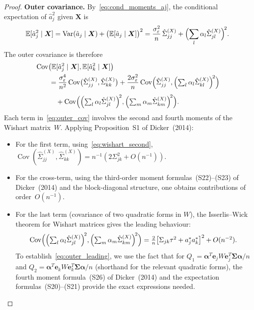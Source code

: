 \documentclass[11pt]{article}
\newcommand{\E}{\mathbb{E}}
\newcommand{\Var}{\operatorname{Var}}
\newcommand{\Cov}{\operatorname{Cov}}
\newcommand{\X}{\bm{X}}
\newcommand{\bSig}{\bm{\Sigma}}
\newcommand{\bal}{\bm{\alpha}}
\newcommand{\be}{\bm{e}}
\begin{document}
\begin{proof}
\medskip
\noindent\textbf{Outer covariance.}\;
By~\eqref{eq:cond_moments_aj}, the conditional expectation of $\hat{a}_j^{2}$ given $\X$ is
\[
  \E[\hat{a}_j^{2}\mid\X]
  = \Var(\hat{a}_j\mid\X)+\bigl(\E[\hat{a}_j\mid\X]\bigr)^{2}
  = \frac{\sigma_\varepsilon^{2}}{n}\,\hat\Sigma_{jj}^{(X)}
    + \Bigl(\sum_l\alpha_l\hat\Sigma_{jl}^{(X)}\Bigr)^{\!2}.
\]
The outer covariance is therefore
\begin{align}
  &\Cov\bigl(\E[\hat{a}_j^{2}\mid\X],\E[\hat{a}_k^{2}\mid\X]\bigr)
  \notag\\
  &\qquad= \frac{\sigma_\varepsilon^{4}}{n^{2}}\Cov\bigl(\hat\Sigma_{jj}^{(X)},
    \hat\Sigma_{kk}^{(X)}\bigr)
  + \frac{2\sigma_\varepsilon^{2}}{n}
    \Cov\Bigl(\hat\Sigma_{jj}^{(X)},
    \Bigl(\textstyle\sum_l\alpha_l\hat\Sigma_{kl}^{(X)}\Bigr)^{\!2}\Bigr)
  \notag\\[4pt]
  &\qquad\quad
  + \Cov\Bigl(\Bigl(\textstyle\sum_l\alpha_l\hat\Sigma_{jl}^{(X)}\Bigr)^{\!2},
    \Bigl(\textstyle\sum_m\alpha_m\hat\Sigma_{km}^{(X)}\Bigr)^{\!2}\Bigr).
  \label{eq:outer_cov}
\end{align}
Each term in~\eqref{eq:outer_cov} involves the second and fourth moments of
the Wishart matrix~$W$.  Applying Proposition~S1 of Dicker~(2014):

\begin{itemize}
\item For the first term, using~\eqref{eq:wishart_second},
  $\Cov(\hat\Sigma_{jj}^{(X)},\hat\Sigma_{kk}^{(X)})
  = n^{-1}(2\Sigma_{jk}^{2}+O(n^{-1}))$.

\item For the cross-term, using the third-order moment
  formulas~(S22)--(S23) of Dicker~(2014) and the block-diagonal structure,
  one obtains contributions of order~$O(n^{-1})$.

\item For the last term (covariance of two quadratic forms in $W$), the
  Isserlis--Wick theorem for Wishart matrices gives the leading behaviour:
  \begin{equation}\label{eq:outer_leading}
    \Cov\Bigl(\Bigl(\textstyle\sum_l\alpha_l\hat\Sigma_{jl}^{(X)}\Bigr)^{\!2},
    \Bigl(\textstyle\sum_m\alpha_m\hat\Sigma_{km}^{(X)}\Bigr)^{\!2}\Bigr)
    = \frac{2}{n}\bigl[\Sigma_{jk}\tau^{2}+a_j^{*}a_k^{*}\bigr]^{2}
      + O(n^{-2}).
  \end{equation}
  To establish~\eqref{eq:outer_leading}, we use the fact that for
  $Q_1=\bal^{T}\be_jW\be_j^{T}\bSig\bal/n$ and
  $Q_2=\bal^{T}\be_kW\be_k^{T}\bSig\bal/n$
  (shorthand for the relevant quadratic forms),
  the fourth moment formula~(S26) of Dicker~(2014) and the expectation
  formulas~(S20)--(S21) provide the exact expressions needed.
\end{itemize}


\end{proof}
\end{document}
